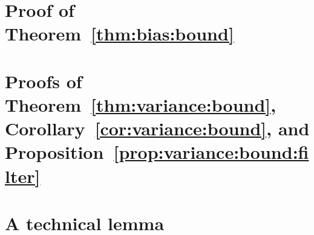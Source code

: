 \documentclass[bj]{imsart}
\numberwithin{equation}{section}
\theoremstyle{remark}
\begin{document}
\begin{appendix}








\section{Proof of Theorem~\ref{thm:bias:bound}}
\label{sec:proofs}


\section{Proofs of Theorem~\ref{thm:variance:bound}, Corollary~\ref{cor:variance:bound}, and Proposition~\ref{prop:variance:bound:filter}}
\label{sec:variance:bounds}


\section{A technical lemma}
\label{sec:tech:results}


\end{appendix}
\end{document}
